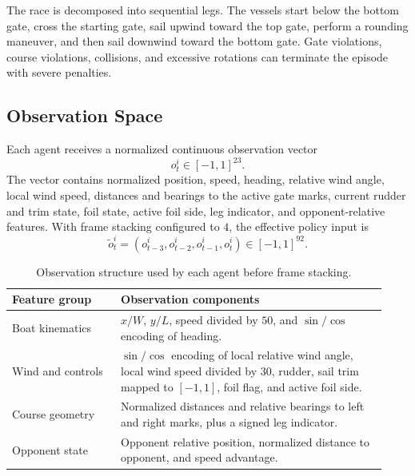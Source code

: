 \documentclass{article}
\begin{document}
The race is decomposed into sequential legs. The vessels start below the bottom gate, cross the starting gate, sail upwind toward the top gate, perform a rounding maneuver, and then sail downwind toward the bottom gate. Gate violations, course violations, collisions, and excessive rotations can terminate the episode with severe penalties.

\subsection{Observation Space}
Each agent receives a normalized continuous observation vector
\begin{equation}
    o_t^i \in [-1,1]^{23}.
\end{equation}
The vector contains normalized position, speed, heading, relative wind angle, local wind speed, distances and bearings to the active gate marks, current rudder and trim state, foil state, active foil side, leg indicator, and opponent-relative features. With frame stacking configured to $4$, the effective policy input is
\begin{equation}
    \tilde{o}_t^i =
    (o_{t-3}^i,o_{t-2}^i,o_{t-1}^i,o_t^i)
    \in [-1,1]^{92}.
\end{equation}

\begin{table}[htpb]
    \centering
    \renewcommand{\arraystretch}{1.2}
    \begin{tabular}{|p{0.27\linewidth}|p{0.66\linewidth}|}
        \hline
        \textbf{Feature group} & \textbf{Observation components} \\
        \hline
        Boat kinematics & $x/W$, $y/L$, speed divided by $50$, and $\sin/\cos$ encoding of heading. \\
        \hline
        Wind and controls & $\sin/\cos$ encoding of local relative wind angle, local wind speed divided by $30$, rudder, sail trim mapped to $[-1,1]$, foil flag, and active foil side. \\
        \hline
        Course geometry & Normalized distances and relative bearings to left and right marks, plus a signed leg indicator. \\
        \hline
        Opponent state & Opponent relative position, normalized distance to opponent, and speed advantage. \\
        \hline
    \end{tabular}
    \caption{Observation structure used by each agent before frame stacking.}
    \label{tab:obs}
\end{table}
\end{document}
